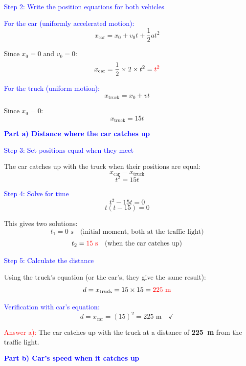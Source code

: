 \begin{exercise}
\begin{solu}
        \textcolor{blue}{Step 2: Write the position equations for both vehicles}

        \textcolor{blue}{For the car (uniformly accelerated motion):}
        \[
            \boxed{x_{\text{car}} = x_0 + v_0 t + \frac{1}{2}at^2}
        \]

        Since $x_0 = 0$ and $v_0 = 0$:
        \[
            x_{\text{car}} = \frac{1}{2} \times 2 \times t^2 = \textcolor{red}{t^2}
        \]

        \textcolor{blue}{For the truck (uniform motion):}
        \[
            \boxed{x_{\text{truck}} = x_0 + vt}
        \]

        Since $x_0 = 0$:
        \[
            x_{\text{truck}} = 15t
        \]

        \textbf{\textcolor{blue}{Part a) Distance where the car catches up}}

        \textcolor{blue}{Step 3: Set positions equal when they meet}

        The car catches up with the truck when their positions are equal:
        \[
            x_{\text{car}} = x_{\text{truck}}
        \]
        \[
            t^2 = 15t
        \]

        \textcolor{blue}{Step 4: Solve for time}
        \[
            t^2 - 15t = 0
        \]
        \[
            t(t - 15) = 0
        \]

        This gives two solutions:
        \[
            t_1 = 0 \text{ s} \quad \text{(initial moment, both at the traffic light)}
        \]
        \[
            t_2 = \textcolor{red}{15 \text{ s}} \quad \text{(when the car catches up)}
        \]

        \textcolor{blue}{Step 5: Calculate the distance}

        Using the truck's equation (or the car's, they give the same result):
        \[
            d = x_{\text{truck}} = 15 \times 15 = \textcolor{red}{225 \text{ m}}
        \]

        \textcolor{blue}{Verification with car's equation:}
        \[
            d = x_{\text{car}} = (15)^2 = 225 \text{ m} \quad \checkmark
        \]

        \textcolor{red}{Answer a):} The car catches up with the truck at a distance of \textbf{\qty{225}{\m}} from the traffic light.

        \vspace{0.5cm}

        \textbf{\textcolor{blue}{Part b) Car's speed when it catches up}}


\end{solu}
\end{exercise}
